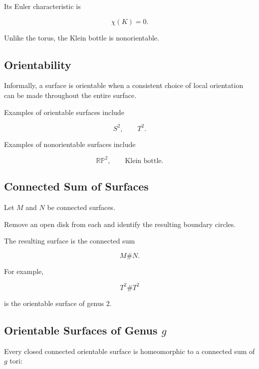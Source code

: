 Its Euler characteristic is

\[
\boxed{
\chi(K)=0.
}
\]

Unlike the torus, the Klein bottle is nonorientable.

\subsection{Orientability}
\label{subsec:surface-orientability}

Informally, a surface is orientable when a consistent choice of local
orientation can be made throughout the entire surface.

Examples of orientable surfaces include

\[
\boxed{
S^2,
\qquad
T^2.
}
\]

Examples of nonorientable surfaces include

\[
\boxed{
\mathbb{RP}^2,
\qquad
\text{Klein bottle}.
}
\]

\subsection{Connected Sum of Surfaces}
\label{subsec:connected-sum-surfaces}

Let \(M\) and \(N\) be connected surfaces.

Remove an open disk from each and identify the resulting boundary circles.

The resulting surface is the connected sum

\[
\boxed{
M\#N.
}
\]

For example,

\[
T^2\#T^2
\]

is the orientable surface of genus \(2\).

\subsection{Orientable Surfaces of Genus \texorpdfstring{\(g\)}{g}}
\label{subsec:orientable-surfaces-genus}

Every closed connected orientable surface is homeomorphic to a connected sum
of \(g\) tori:

